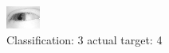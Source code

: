 \begin{figure}[h!]
\begin{center}
\includegraphics[width=0.60\columnwidth]{figures/ID2422_class_3_target_4.png}
\end{center}
\caption{ Classification: 3 actual target: 4}
\label{fig:ID2422_class_3_target_4}
\end{figure}
